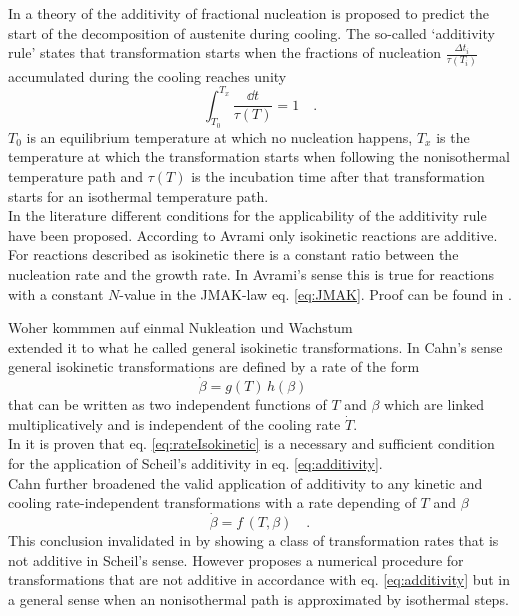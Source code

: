 In \cite{scheil_anlaufzeit_1935} a theory of the additivity of fractional nucleation is proposed to predict the start of the decomposition of austenite during cooling.  The so-called `additivity rule' states that transformation starts when the fractions of nucleation $\frac{\Delta t_i}{\tau(T_i)}$ accumulated during the cooling reaches unity
\begin{equation}
	\int^{T_{x}}_{T_{0}} \frac{\dd{t}}{\tau(T)} = 1 \quad. %
	\label{eq:additivity}
\end{equation}
$T_{0}$ is an equilibrium temperature at which no nucleation happens, $T_{x}$ is the temperature at which the transformation starts when following the nonisothermal temperature path and $\tau(T)$ is the incubation time after that transformation starts for an isothermal temperature path. \\

In the literature different conditions for the applicability of the additivity rule have been proposed. According to Avrami only isokinetic reactions are additive. For reactions described as isokinetic there is a constant ratio between the nucleation rate and the growth rate. In Avrami's sense this is true for reactions with a constant $N$-value in the JMAK-law eq. \ref{eq:JMAK}. Proof can be found in \cite{agarwal_mathematical_1981}. 


Woher kommmen auf einmal Nukleation und Wachstum\\


\cite{cahn_transformation_1956} extended it to what he called general isokinetic transformations. In Cahn's sense general isokinetic transformations are defined by a rate of the form
\begin{equation}
\dot{\beta} = g(T) \, h(\beta) \quad \label{eq:rateIsokinetic}
\end{equation}
that can be written as two independent functions of $T$ and $\beta$ which are linked multiplicatively and is independent of the cooling rate $\dot T$. \\ 
In \cite{todinov_alternative_1998} it is proven that eq. \ref{eq:rateIsokinetic} is a necessary and sufficient condition for the application of Scheil's additivity in eq. \ref{eq:additivity}.\\
Cahn further broadened the valid application of additivity to any kinetic and cooling rate-independent transformations with a rate depending of $T$ and $\beta$ 
\begin{equation}
	\dot{\beta} = f\,(T,\beta) \quad. \label{eq:rateKinetic}
\end{equation}
This conclusion invalidated in \cite{lusk_rule_1997} by showing a class of transformation rates that is not additive in Scheil's sense. 
However \cite{agarwal_mathematical_1981} proposes a numerical procedure for transformations that are not additive in accordance with eq. \ref{eq:additivity} but in a general sense when an nonisothermal path is approximated by isothermal steps. \\

